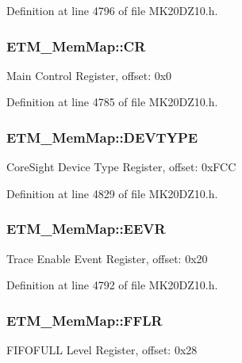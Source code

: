 Definition at line 4796 of file M\+K20\+D\+Z10.\+h.

\subsubsection[{\texorpdfstring{CR}{CR}}]{ E\+T\+M\+\_\+\+Mem\+Map\+::\+CR}\hypertarget{struct_e_t_m___mem_map_a1073427a5d49856222f104cfccad7dc9}{}\label{struct_e_t_m___mem_map_a1073427a5d49856222f104cfccad7dc9}
Main Control Register, offset\+: 0x0 

Definition at line 4785 of file M\+K20\+D\+Z10.\+h.

\subsubsection[{\texorpdfstring{D\+E\+V\+T\+Y\+PE}{DEVTYPE}}]{ E\+T\+M\+\_\+\+Mem\+Map\+::\+D\+E\+V\+T\+Y\+PE}\hypertarget{struct_e_t_m___mem_map_a860e1c89b58a257cd4783a2c488360ee}{}\label{struct_e_t_m___mem_map_a860e1c89b58a257cd4783a2c488360ee}
Core\+Sight Device Type Register, offset\+: 0x\+F\+CC 

Definition at line 4829 of file M\+K20\+D\+Z10.\+h.

\subsubsection[{\texorpdfstring{E\+E\+VR}{EEVR}}]{ E\+T\+M\+\_\+\+Mem\+Map\+::\+E\+E\+VR}\hypertarget{struct_e_t_m___mem_map_a8f38f88c8652ae9e793d53c519dd657e}{}\label{struct_e_t_m___mem_map_a8f38f88c8652ae9e793d53c519dd657e}
Trace Enable Event Register, offset\+: 0x20 

Definition at line 4792 of file M\+K20\+D\+Z10.\+h.

\subsubsection[{\texorpdfstring{F\+F\+LR}{FFLR}}]{ E\+T\+M\+\_\+\+Mem\+Map\+::\+F\+F\+LR}\hypertarget{struct_e_t_m___mem_map_ad9b815d0f98a1553e6ca965a2d0c2264}{}\label{struct_e_t_m___mem_map_ad9b815d0f98a1553e6ca965a2d0c2264}
F\+I\+F\+O\+F\+U\+LL Level Register, offset\+: 0x28 

